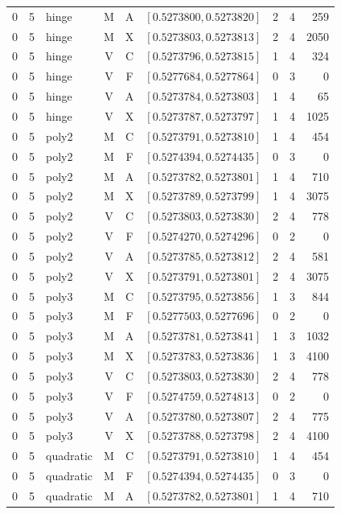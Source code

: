 \begin{longtable}{r r l c c l r r r}
0 & 5 & hinge & M & A & $[0.5273800,0.5273820]$ & 2 & 4 & 259 \\
0 & 5 & hinge & M & X & $[0.5273803,0.5273813]$ & 2 & 4 & 2050 \\
0 & 5 & hinge & V & C & $[0.5273796,0.5273815]$ & 1 & 4 & 324 \\
0 & 5 & hinge & V & F & $[0.5277684,0.5277864]$ & 0 & 3 & 0 \\
0 & 5 & hinge & V & A & $[0.5273784,0.5273803]$ & 1 & 4 & 65 \\
0 & 5 & hinge & V & X & $[0.5273787,0.5273797]$ & 1 & 4 & 1025 \\
0 & 5 & poly2 & M & C & $[0.5273791,0.5273810]$ & 1 & 4 & 454 \\
0 & 5 & poly2 & M & F & $[0.5274394,0.5274435]$ & 0 & 3 & 0 \\
0 & 5 & poly2 & M & A & $[0.5273782,0.5273801]$ & 1 & 4 & 710 \\
0 & 5 & poly2 & M & X & $[0.5273789,0.5273799]$ & 1 & 4 & 3075 \\
0 & 5 & poly2 & V & C & $[0.5273803,0.5273830]$ & 2 & 4 & 778 \\
0 & 5 & poly2 & V & F & $[0.5274270,0.5274296]$ & 0 & 2 & 0 \\
0 & 5 & poly2 & V & A & $[0.5273785,0.5273812]$ & 2 & 4 & 581 \\
0 & 5 & poly2 & V & X & $[0.5273791,0.5273801]$ & 2 & 4 & 3075 \\
0 & 5 & poly3 & M & C & $[0.5273795,0.5273856]$ & 1 & 3 & 844 \\
0 & 5 & poly3 & M & F & $[0.5277503,0.5277696]$ & 0 & 2 & 0 \\
0 & 5 & poly3 & M & A & $[0.5273781,0.5273841]$ & 1 & 3 & 1032 \\
0 & 5 & poly3 & M & X & $[0.5273783,0.5273836]$ & 1 & 3 & 4100 \\
0 & 5 & poly3 & V & C & $[0.5273803,0.5273830]$ & 2 & 4 & 778 \\
0 & 5 & poly3 & V & F & $[0.5274759,0.5274813]$ & 0 & 2 & 0 \\
0 & 5 & poly3 & V & A & $[0.5273780,0.5273807]$ & 2 & 4 & 775 \\
0 & 5 & poly3 & V & X & $[0.5273788,0.5273798]$ & 2 & 4 & 4100 \\
0 & 5 & quadratic & M & C & $[0.5273791,0.5273810]$ & 1 & 4 & 454 \\
0 & 5 & quadratic & M & F & $[0.5274394,0.5274435]$ & 0 & 3 & 0 \\
0 & 5 & quadratic & M & A & $[0.5273782,0.5273801]$ & 1 & 4 & 710 \\

\end{longtable}
